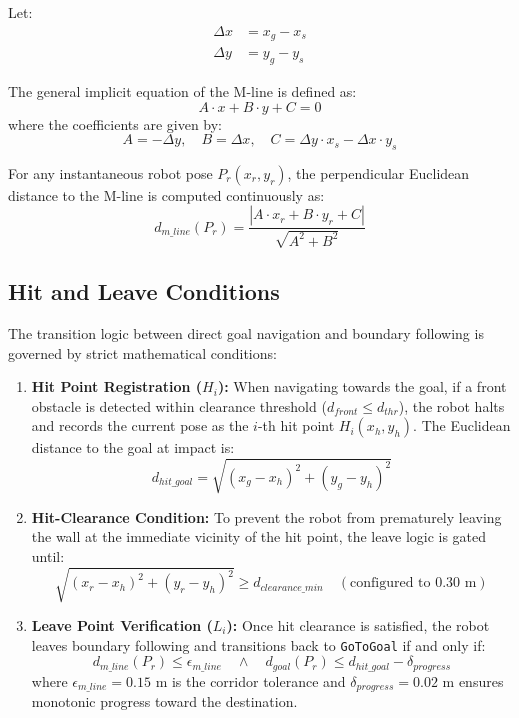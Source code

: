 \documentclass[11pt,a4paper]{article}
\begin{document}
Let:
\begin{align}
\Delta x &= x_g - x_s \\
\Delta y &= y_g - y_s
\end{align}

The general implicit equation of the M-line is defined as:
\begin{equation}
A \cdot x + B \cdot y + C = 0
\end{equation}
where the coefficients are given by:
\begin{equation}
A = -\Delta y, \quad B = \Delta x, \quad C = \Delta y \cdot x_s - \Delta x \cdot y_s
\end{equation}

For any instantaneous robot pose $P_r(x_r, y_r)$, the perpendicular Euclidean distance to the M-line is computed continuously as:
\begin{equation}
d_{m\_line}(P_r) = \frac{|A \cdot x_r + B \cdot y_r + C|}{\sqrt{A^2 + B^2}}
\end{equation}

\subsection{Hit and Leave Conditions}
The transition logic between direct goal navigation and boundary following is governed by strict mathematical conditions:

\begin{enumerate}
    \item \textbf{Hit Point Registration ($H_i$):} When navigating towards the goal, if a front obstacle is detected within clearance threshold ($d_{front} \le d_{thr}$), the robot halts and records the current pose as the $i$-th hit point $H_i(x_h, y_h)$. The Euclidean distance to the goal at impact is:
    \begin{equation}
    d_{hit\_goal} = \sqrt{(x_g - x_h)^2 + (y_g - y_h)^2}
    \end{equation}

    \item \textbf{Hit-Clearance Condition:} To prevent the robot from prematurely leaving the wall at the immediate vicinity of the hit point, the leave logic is gated until:
    \begin{equation}
    \sqrt{(x_r - x_h)^2 + (y_r - y_h)^2} \ge d_{clearance\_min} \quad (\text{configured to } 0.30\text{ m})
    \end{equation}

    \item \textbf{Leave Point Verification ($L_i$):} Once hit clearance is satisfied, the robot leaves boundary following and transitions back to \texttt{GoToGoal} if and only if:
    \begin{equation}
    d_{m\_line}(P_r) \le \epsilon_{m\_line} \quad \land \quad d_{goal}(P_r) \le d_{hit\_goal} - \delta_{progress}
    \end{equation}
    where $\epsilon_{m\_line} = 0.15\text{ m}$ is the corridor tolerance and $\delta_{progress} = 0.02\text{ m}$ ensures monotonic progress toward the destination.
\end{enumerate}
\end{document}
